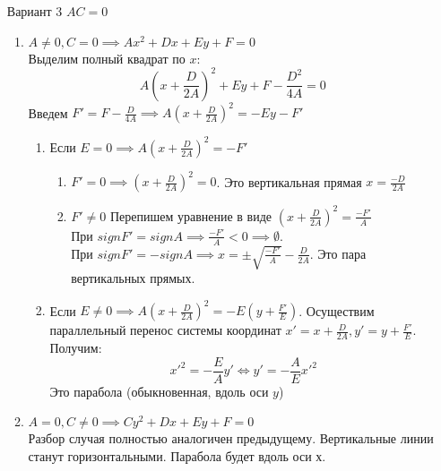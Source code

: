 \documentclass[a4paper,12pt,twoside]{article}
\begin{document}
\begin{enumerate}
\begin{enumerate}
\end{enumerate}

\bigskip
\item[Вариант 3] $AC = 0 $

\begin{enumerate}

\item $ A \neq 0, C = 0 \implies Ax^2 + Dx + Ey + F = 0 $ \\
Выделим полный квадрат по $x$:
\[
A \left( x + \frac{D}{2A} \right)^2 + Ey + F - \frac{D^2}{4A} = 0
\]
Введем 
$ F' = F - \frac{D}{4A} \implies A \left( x + \frac{D}{2A} \right)^2 = -Ey - F' $

\begin{enumerate}
\item Если $ E =  0 \implies A \left( x + \frac{D}{2A} \right)^2 = -F' $
\begin{enumerate}
\item $F' = 0 \implies \left( x + \frac{D}{2A} \right)^2 = 0 $. 
Это вертикальная прямая $ x = \frac{-D}{2A} $
\item $ F' \neq 0 $ Перепишем уравнение в виде 
$ \left( x + \frac{D}{2A} \right)^2 = \frac{-F'}{A} $ \\
При $ signF' = signA \implies \frac{-F'}{A} < 0 \implies \emptyset $.  \\
При $ signF' = - signA  \implies x = \pm \sqrt{\frac{-F'}{A}} - \frac{D}{2A} $. Это пара вертикальных прямых.
\end{enumerate}

\item Если $ E \neq 0 \implies A \left( x + \frac{D}{2A} \right)^2 = -E( y + \frac{F'}{E} ) $.
Осуществим параллельный перенос системы координат 
$ x' = x + \frac{D}{2A}, y' = y + \frac{F'}{E} $. Получим:
\[
{x'}^2 = - \frac{E}{A} y'  \iff y' = - \frac{A}{E} {x'}^2
\]
Это парабола (обыкновенная, вдоль оси $y$)
\end{enumerate}

\item $ A = 0, C \neq 0 \implies Cy^2 + Dx + Ey + F = 0  $ \\
Разбор случая полностью аналогичен предыдущему. Вертикальные линии станут горизонтальными. Парабола будет вдоль оси х.
\end{enumerate}
\end{enumerate}





\newpage
\printindex
\end{document}
